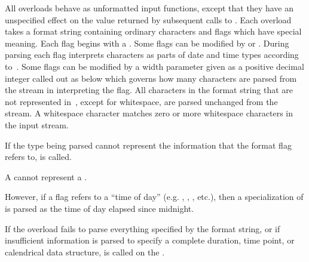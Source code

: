 \pnum
All  overloads behave as unformatted input functions,
except that they have an unspecified effect
on the value returned by subsequent calls to .
Each overload takes a format string containing ordinary characters
and flags which have special meaning.
Each flag begins with a \noncxxtcode{\%}.
Some flags can be modified by  or .
During parsing each flag interprets characters as parts of date and time types
according to~.
Some flags can be modified by a width parameter
given as a positive decimal integer called out as  below
which governs how many characters are parsed from the stream in interpreting the flag.
All characters in the format string that are not represented in~,
except for whitespace, are parsed unchanged from the stream.
A whitespace character matches zero or more whitespace characters in the input stream.

\pnum
If the type being parsed cannot represent
the information that the format flag refers to,
 is called.
\begin{example}
A  cannot represent a .
\end{example}
However, if a flag refers to a ``time of day''
(e.g. , , , etc.),
then a specialization of  is parsed as
the time of day elapsed since midnight.

\pnum
If the  overload fails to parse
everything specified by the format string,
or if insufficient information is parsed to specify a complete
duration, time point, or calendrical data structure,
is called on the .

